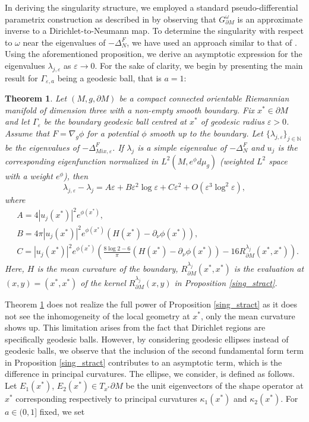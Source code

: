 \documentclass[12pt,a4paper]{amsart}
\numberwithin{equation}{section}
\theoremstyle{plain}
\newtheorem{theorem}{Theorem}[section]
\theoremstyle{definition}
\begin{document}
    In deriving the singularity structure, we employed a standard pseudo-differential parametrix construction as described in \cite{NursultanovTzouTzou, NursultanovTradTzou} by observing that $G_{\partial M}^\omega$ is an approximate inverse to a Dirichlet-to-Neumann map. To determine the singularity with respect to $\omega$ near the eigenvalues of $-\Delta_N^F$, we have used an approach similar to that of \cite{HHHmonog}. Using the aforementioned proposition, we derive an asymptotic expression for the eigenvalues $\lambda_{j,\varepsilon}$ as $\varepsilon\rightarrow 0$. For the sake of clarity, we begin by presenting the main result for $\Gamma_{\varepsilon,a}$ being a geodesic ball, that is $a=1$:
	
	\begin{theorem}\label{main_for_ball}
		Let $(M,g,\partial M)$ be a compact connected orientable Riemannian manifold of dimension three with a non-empty smooth boundary. Fix $x^*\in \partial M$ and let $\Gamma_{\varepsilon}$ be the boundary geodesic ball centred at $x^*$ of geodesic radius $\varepsilon>0$. Assume that $F = \nabla_g \phi$ for a potential $\phi$ smooth up to the boundary. Let $\{\lambda_{j,\varepsilon}\}_{j\in \mathbb N}$ be the eigenvalues of $-\Delta_{Mix,\varepsilon}^F$. If $\lambda_j$ is a simple eigenvalue of $-\Delta_N^F$ and $u_j$ is the corresponding eigenfunction normalized in $L^2(M,e^\phi d\mu_g)$ (weighted $L^2$ space with a weight $e^\phi$), then
		\begin{equation*}
			\lambda_{j,\varepsilon} - \lambda_j = A\varepsilon + B\varepsilon^2 \log\varepsilon + C\varepsilon^2 + O(\varepsilon^3\log^2\varepsilon),
		\end{equation*}
		where
		\begin{align*}
			&A = 4 |u_j(x^*)|^2e^{\phi(x^*)},\\[1em]
			&B = 4 \pi |u_j(x^*)|^2e^{\phi(x^*)} (H(x^*)-\partial_{\nu}\phi(x^*)),\\[1em]
			&C = |u_j(x^*)|^2 e^{\phi(x^*)} \left( \frac{8\log 2 - 6}{\pi}(H(x^*)-\partial_{\nu}\phi(x^*)) - 16R_{\partial M}^{\lambda_j}(x^*,x^*) \right).
		\end{align*}
		Here, $H$ is the mean curvature of the boundary, $R_{\partial M}^{\lambda_j}(x^*,x^*)$ is the evaluation at $(x,y)=(x^*,x^*)$ of the kernel $R_{\partial M}^{\lambda_j}(x,y)$ in Proposition \ref{sing_stract}.
	\end{theorem}
	Theorem \ref{main_for_ball} does not realize the full power of Proposition \ref{sing_stract} as it does not see the inhomogeneity of the local geometry at $x^*$, only the mean curvature shows up. This limitation arises from the fact that Dirichlet regions are specifically geodesic balls. However, by considering geodesic ellipses instead of geodesic balls, we observe that the inclusion of the second fundamental form term in Proposition \ref{sing_stract} contributes to an asymptotic term, which is the difference in principal curvatures. The ellipse, we consider, is defined as follows. Let $E_1(x^*)$, $E_2(x^*) \in T_{x^*}\partial M$ be the unit eigenvectors of the shape operator at $x^*$ corresponding respectively to principal curvatures $\kappa_1(x^*)$ and $\kappa_2(x^*)$. For $a\in (0,1]$ fixed, we set
\end{document}
